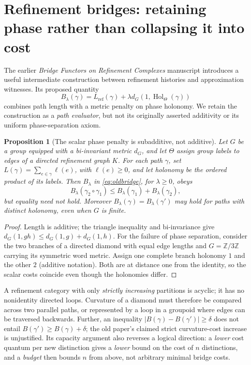\documentclass[11pt,letterpaper]{article}
\newtheorem{proposition}[theorem]{Proposition}
\begin{document}
\appendix
\section{Refinement bridges: retaining phase rather than collapsing it into cost}\label{sec:bridge}
The earlier \emph{Bridge Functors on Refinement Complexes} manuscript \cite{bridgeoriginal}
introduces a useful intermediate construction between refinement histories and
approximation witnesses. Its proposed quantity
\begin{equation}\label{eq:oldbridge}
B_\lambda(\gamma)=L_{\mathrm{ref}}(\gamma)
      +\lambda d_G(1,\operatorname{Hol}_\Theta(\gamma))
\end{equation}
combines path length with a metric penalty on phase holonomy. We retain the
construction as a \emph{path evaluator}, but not its originally asserted
additivity or its uniform phase-separation axiom.

\begin{proposition}[The scalar phase penalty is subadditive, not additive]
Let $G$ be a group equipped with a bi-invariant metric $d_G$, and let
$\Theta$ assign group labels to edges of a directed refinement graph $K$.
For each path $\gamma$, set $L(\gamma)=\sum_{e\in\gamma}\ell(e)$,
with $\ell(e)\ge0$, and let holonomy be the ordered product of its labels.
Then $B_\lambda$ in \eqref{eq:oldbridge}, for $\lambda\ge0$, obeys
\[
B_\lambda(\gamma_2\circ\gamma_1)
\le B_\lambda(\gamma_1)+B_\lambda(\gamma_2),
\]
but equality need not hold. Moreover $B_\lambda(\gamma)=B_\lambda(\gamma')$
may hold for paths with distinct holonomy, even when $G$ is finite.
\end{proposition}
\begin{proof}
Length is additive; the triangle inequality and bi-invariance give
$d_G(1,gh)\le d_G(1,g)+d_G(1,h)$. For the failure of phase separation,
consider the two branches of a directed diamond with equal edge lengths
and $G=\mathbb Z/3\mathbb Z$ carrying its symmetric word metric.
Assign one complete branch holonomy $1$ and the other $2$ (additive
notation). Both are at distance one from the identity, so the
scalar costs coincide even though the holonomies differ.
\end{proof}

A refinement category with only \emph{strictly increasing} partitions is
acyclic; it has no nonidentity directed loops. Curvature of a diamond must
therefore be compared across two parallel paths, or represented by a loop
in a groupoid where edges can be traversed backwards. Further, an inequality
$|B(\gamma)-B(\gamma')|\ge\delta$ does not entail
$B(\gamma')\ge B(\gamma)+\delta$; the old paper's claimed strict
curvature-cost increase is unjustified. Its capacity argument also reverses
a logical direction: a \emph{lower} cost quantum per new distinction gives
a \emph{lower} bound on the cost of $n$ distinctions, and a \emph{budget}
then bounds $n$ from above, not arbitrary minimal bridge costs.
\end{document}
